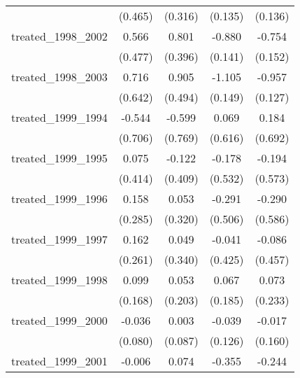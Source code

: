 {\begin{tabular}{l*{4}{c}}
            &     (0.465)         &     (0.316)         &     (0.135)         &     (0.136)         \\
[1em]
treated\_1998\_2002&       0.566         &       0.801\sym{*}  &      -0.880\sym{***}&      -0.754\sym{***}\\
            &     (0.477)         &     (0.396)         &     (0.141)         &     (0.152)         \\
[1em]
treated\_1998\_2003&       0.716         &       0.905         &      -1.105\sym{***}&      -0.957\sym{***}\\
            &     (0.642)         &     (0.494)         &     (0.149)         &     (0.127)         \\
[1em]
treated\_1999\_1994&      -0.544         &      -0.599         &       0.069         &       0.184         \\
            &     (0.706)         &     (0.769)         &     (0.616)         &     (0.692)         \\
[1em]
treated\_1999\_1995&       0.075         &      -0.122         &      -0.178         &      -0.194         \\
            &     (0.414)         &     (0.409)         &     (0.532)         &     (0.573)         \\
[1em]
treated\_1999\_1996&       0.158         &       0.053         &      -0.291         &      -0.290         \\
            &     (0.285)         &     (0.320)         &     (0.506)         &     (0.586)         \\
[1em]
treated\_1999\_1997&       0.162         &       0.049         &      -0.041         &      -0.086         \\
            &     (0.261)         &     (0.340)         &     (0.425)         &     (0.457)         \\
[1em]
treated\_1999\_1998&       0.099         &       0.053         &       0.067         &       0.073         \\
            &     (0.168)         &     (0.203)         &     (0.185)         &     (0.233)         \\
[1em]
treated\_1999\_2000&      -0.036         &       0.003         &      -0.039         &      -0.017         \\
            &     (0.080)         &     (0.087)         &     (0.126)         &     (0.160)         \\
[1em]
treated\_1999\_2001&      -0.006         &       0.074         &      -0.355\sym{*}  &      -0.244         \\

\end{tabular}}
